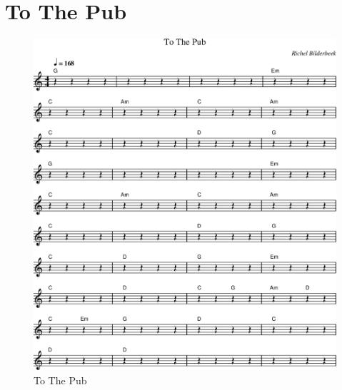 \chapter{To The Pub}



\begin{figure}[!htbp]
  \includegraphics[width=\textwidth,height=\textheight,keepaspectratio]{../songs/42_to_the_pub.png}
  \caption{To The Pub}
  \label{fig:42_to_the_pub}
\end{figure}
